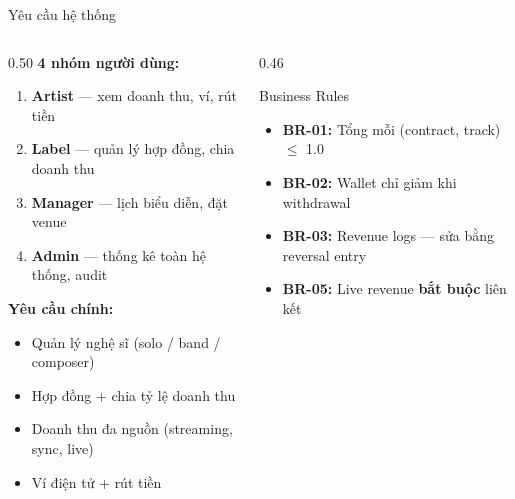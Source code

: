 \begin{frame}{Yêu cầu hệ thống}
    \begin{columns}[T]
        \begin{column}{0.50\textwidth}
            \textbf{4 nhóm người dùng:}
            \begin{enumerate}
                \item \textbf{Artist} --- xem doanh thu, ví, rút tiền
                \item \textbf{Label} --- quản lý hợp đồng, chia doanh thu
                \item \textbf{Manager} --- lịch biểu diễn, đặt venue
                \item \textbf{Admin} --- thống kê toàn hệ thống, audit
            \end{enumerate}

            \vspace{0.5em}
            \textbf{Yêu cầu chính:}
            \begin{itemize}\small
                \item Quản lý nghệ sĩ (solo / band / composer)
                \item Hợp đồng + chia tỷ lệ doanh thu
                \item Doanh thu đa nguồn (streaming, sync, live)
                \item Ví điện tử + rút tiền
            \end{itemize}
        \end{column}
        \begin{column}{0.46\textwidth}
            \begin{block}{Business Rules}
                \begin{itemize}\small
                    \item \textbf{BR-01:} Tổng  mỗi
                          (contract, track) $\leq$ 1.0
                    \item \textbf{BR-02:} Wallet chỉ giảm khi withdrawal
                    \item \textbf{BR-03:} Revenue logs 
                          --- sửa bằng reversal entry
                    \item \textbf{BR-05:} Live revenue \textbf{bắt buộc}
                          liên kết 
                \end{itemize}
            \end{block}
        \end{column}
    \end{columns}

\end{frame}
